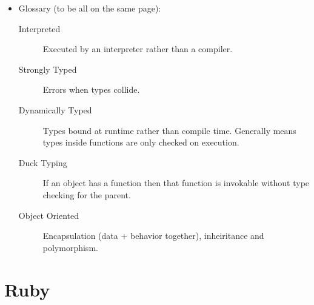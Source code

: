 \documentclass[10pt, twocolumn, landscape]{article}
\begin{document}
\begin{itemize}
    \item Glossary (to be all on the same page):
        \begin{description}
            \item[Interpreted] Executed by an interpreter rather than a
                compiler.
            \item[Strongly Typed] Errors when types collide.
            \item[Dynamically Typed] Types bound at runtime rather than compile
                time. Generally means types inside functions are only checked on
                execution.
            \item[Duck Typing] If an object has a function then that function is
                invokable without type checking for the parent.
            \item[Object Oriented] Encapsulation (data + behavior together),
                inheiritance and polymorphism.
        \end{description}
\end{itemize}

\section{Ruby}
\end{document}
